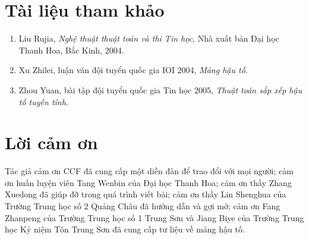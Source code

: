 \documentclass[11pt]{article}
\begin{document}
\section*{Tài liệu tham khảo}

\begin{enumerate}
\item Liu Rujia, \textit{Nghệ thuật thuật toán và thi Tin học}, Nhà xuất bản
Đại học Thanh Hoa, Bắc Kinh, 2004.
\item Xu Zhilei, luận văn đội tuyển quốc gia IOI 2004, \textit{Mảng hậu tố}.
\item Zhou Yuan, bài tập đội tuyển quốc gia Tin học 2005, \textit{Thuật toán
sắp xếp hậu tố tuyến tính}.
\end{enumerate}

\section*{Lời cảm ơn}

Tác giả cảm ơn CCF đã cung cấp một diễn đàn để trao đổi với mọi người; cảm
ơn huấn luyện viên Tang Wenbin của Đại học Thanh Hoa; cảm ơn thầy Zhang
Xuedong đã giúp đỡ trong quá trình viết bài; cảm ơn thầy Lin Shenghua của
Trường Trung học số 2 Quảng Châu đã hướng dẫn và gợi mở; cảm ơn Fang Zhanpeng
của Trường Trung học số 1 Trung Sơn và Jiang Biye của Trường Trung học Kỷ
niệm Tôn Trung Sơn đã cung cấp tư liệu về mảng hậu tố.
\end{document}
